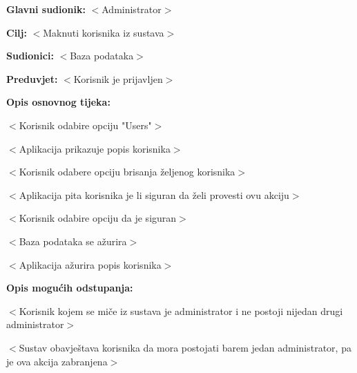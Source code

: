 					\noindent {}
					\begin{packed_item}

						\item \textbf{Glavni sudionik:} $<$Administrator$>$
						\item \textbf{Cilj:} $<$Maknuti korisnika iz sustava$>$
						\item \textbf{Sudionici:} $<$Baza podataka$>$
						\item \textbf{Preduvjet:} $<$Korisnik je prijavljen$>$
						\item \textbf{Opis osnovnog tijeka:}

						\item[] \begin{packed_enum}

							\item $<$Korisnik odabire opciju "Users"$>$
							\item $<$Aplikacija prikazuje popis korisnika$>$
							\item $<$Korisnik odabere opciju brisanja željenog korisnika$>$
							\item $<$Aplikacija pita korisnika je li siguran da želi provesti ovu akciju$>$
							\item $<$Korisnik odabire opciju da je siguran$>$
							\item $<$Baza podataka se ažurira$>$
							\item $<$Aplikacija ažurira popis korisnika$>$

						\end{packed_enum}

						\item \textbf{Opis mogućih odstupanja:}

						\item[] \begin{packed_item}

							\item[3.a] $<$Korisnik kojem se miče iz sustava je administrator i ne postoji nijedan
							drugi administrator$>$
							\item[] \begin{packed_enum}

								\item $<$Sustav obavještava korisnika da mora postojati
								barem jedan administrator, pa je ova akcija zabranjena$>$

							\end{packed_enum}

						\end{packed_item}
					\end{packed_item}

